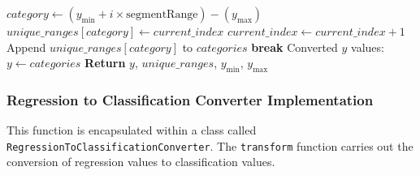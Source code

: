 \documentclass[a4paper, 12pt]{report}
\begin{document}
\begin{algorithm}[H]
\begin{algorithmic}[1]
                        \State $category \gets (y_{\text{min}} + i \times \text{segmentRange}) - (y_{\text{max}})$
                            \State $unique\_ranges[category] \gets current\_index$
                            \State $current\_index \gets current\_index + 1$
                        \EndIf
                        \State Append $unique\_ranges[category]$ to $categories$
                        \State \textbf{break}
                    \EndIf
                \EndIf
            \EndFor
        \EndFor
        \State Converted $y$ values: $y \gets categories$
        \State \textbf{Return} $y$, $unique\_ranges$, $y_{\text{min}}$, $y_{\text{max}}$
    \EndIf
    \end{algorithmic}
    \end{algorithm}

\subsubsection{Regression to Classification Converter Implementation}
This function is encapsulated within a class called \texttt{RegressionToClassificationConverter}. 
The \texttt{transform} function carries out the conversion of regression values to classification values.
\end{document}

